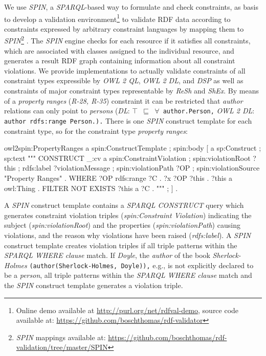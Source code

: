 \documentclass{acm_proc_article-sp}
\newcommand{\ms}[1]{%
  \texttt{#1}
}
\begin{document}
We use \emph{SPIN}, 
a \emph{SPARQL}-based way to formulate and check constraints, as basis to develop a
validation environment\footnote{Online demo available at \url{http://purl.org/net/rdfval-demo}, source code available at: \url{https://github.com/boschthomas/rdf-validator}\label{rdf-validator}} to validate RDF data according to constraints expressed by arbitrary constraint languages by mapping them to \emph{SPIN}\footnote{\emph{SPIN} mappings available at: \url{https://github.com/boschthomas/rdf-validation/tree/master/SPIN}\label{spin-mappings}} \cite{BoschEckert2014-2}.
The \emph{SPIN} engine checks for each resource if it satisfies all constraints, which are associated with classes assigned to the individual resource, and generates a result RDF graph containing information about all constraint violations.
We provide implementations to actually validate constraints of all constraint types expressible by \emph{OWL 2 QL}, \emph{OWL 2 DL}, and \emph{DSP} 
as well as constraints of major constraint types representable by \emph{ReSh} and \emph{ShEx}.
By means of a \emph{property ranges} (\emph{R-28, R-35}) constraint it can be restricted that \emph{author} relations can only point to \emph{persons} (\emph{DL}: {\small\ms{$\top$ $\sqsubseteq$ $\forall$ author.Person,}} \emph{OWL 2 DL}: {\small\ms{author rdfs:range Person.).}}
There is one \emph{SPIN} construct template for each constraint type, so for the constraint type \emph{property ranges}:

\begin{ex}
owl2spin:PropertyRanges a spin:ConstructTemplate ;
  spin:body [ a sp:Construct ; sp:text """
    CONSTRUCT {
      _:cv a spin:ConstraintViolation ;
        spin:violationRoot ?this ;
        rdfs:label ?violationMessage ;
        spin:violationPath ?OP ;
        spin:violationSource "Property Ranges" . }
    WHERE {	  
      ?OP rdfs:range ?C . ?x ?OP ?this . ?this a owl:Thing .
      FILTER NOT EXISTS { ?this a ?C } . } """ ; ] .
\end{ex}

A \emph{SPIN} construct template contains a \emph{SPARQL CONSTRUCT} query which generates constraint violation triples (\emph{spin:Constraint Violation}) indicating the subject (\emph{spin:violationRoot}) and the properties (\emph{spin:violationPath}) causing violations, and the reason why violations have been raised (\emph{rdfs:label}).
A \emph{SPIN} construct template creates violation triples if all triple patterns within the \emph{SPARQL WHERE clause} match.
If \emph{Doyle}, the \emph{author} of the book \emph{Sherlock-Holmes} {\small\ms{(author(Sherlock-Holmes, Doyle)),}} e.g., is not explicitly declared to be a \emph{person},
all triple patterns within the \emph{SPARQL WHERE clause} match
and the \emph{SPIN} construct template generates a violation triple.
\end{document}
